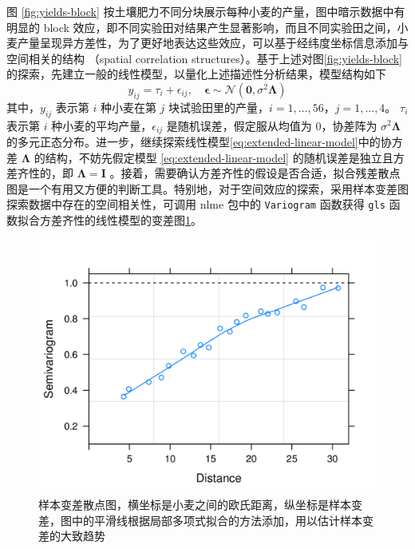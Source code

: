 \documentclass[12pt,a4paper,UTF8,twoside]{book}
\theoremstyle{definition}
\theoremstyle{definition}
\theoremstyle{definition}
\theoremstyle{remark}
\begin{document}
图 \ref{fig:yields-block}
按土壤肥力不同分块展示每种小麦的产量，图中暗示数据中有明显的 block
效应，即不同实验田对结果产生显著影响，而且不同实验田之间，小麦产量呈现异方差性，为了更好地表达这些效应，可以基于经纬度坐标信息添加与空间相关的结构
（spatial correlation structures）。基于上述对图\ref{fig:yields-block}
的探索，先建立一般的线性模型，以量化上述描述性分析结果，模型结构如下
\begin{equation}
y_{ij} = \tau_i + \epsilon_{ij}, \quad \boldsymbol{\epsilon} \sim \mathcal{N}(\mathbf{0},\sigma^2 \boldsymbol{\Lambda}) \label{eq:extended-linear-model}
\end{equation} \noindent 其中，\(y_{ij}\) 表示第 \(i\) 种小麦在第 \(j\)
块试验田里的产量，\(i = 1,\ldots,56\)，\(j = 1,\ldots,4\)。 \(\tau_i\)
表示第 \(i\) 种小麦的平均产量，\(\epsilon_{ij}\)
是随机误差，假定服从均值为 0，协差阵为 \(\sigma^2 \boldsymbol{\Lambda}\)
的多元正态分布。进一步，继续探索线性模型\eqref{eq:extended-linear-model}中的协方差
\(\boldsymbol{\Lambda}\) 的结构，不妨先假定模型
\eqref{eq:extended-linear-model} 的随机误差是独立且方差齐性的，即
\(\boldsymbol{\Lambda} = \boldsymbol{I}\)
。接着，需要确认方差齐性的假设是否合适，拟合残差散点图是一个有用又方便的判断工具。特别地，对于空间效应的探索，采用样本变差图探索数据中存在的空间相关性，可调用
nlme 包中的 \texttt{Variogram} 函数获得 \texttt{gls}
函数拟合方差齐性的线性模型的变差图\ref{fig:yields-variogram}。

\begin{figure}

{\centering \includegraphics[width=0.7\linewidth]{figures/Yields-Variogram} 

}

\caption{样本变差散点图，横坐标是小麦之间的欧氏距离，纵坐标是样本变差，图中的平滑线根据局部多项式拟合的方法添加，用以估计样本变差的大致趋势}\label{fig:yields-variogram}
\end{figure}
\end{document}
